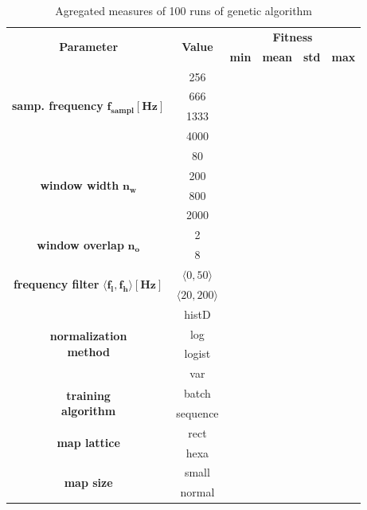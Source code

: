 \documentclass[a4paper,jurnal]{IEEEtran}
\begin{document}
\begin{table}[h]
	\caption{Agregated measures of 100 runs of genetic algorithm}
	\centering
	\begin{tabular}{|c|c||r|r|r|r|}
		\hline
			\multirow{2}{*}{\textbf{Parameter}} & 
			\multirow{2}{*}{\textbf{Value}} & 
			\multicolumn{4}{c|}{\textbf{Fitness}} \\ 
		\cline{3-6}
			& &
			\textbf{min} &
			\textbf{mean} &
			\textbf{std} &
			\textbf{max} \\
		\hline
		\hline
			\multirow{4}{*}{\parbox[c]{20mm}{\centering\textbf{samp. frequency}\\ $ \mathbf{f_{sampl}[Hz]} $}}
			& 256 & & & & \\ \cline{2-6}
			& 666 & & & & \\ \cline{2-6}
			& 1333 & & & & \\ \cline{2-6}
			& 4000 & & & & \\ 
		\hline
			\multirow{4}{*}{\parbox[c]{20mm}{\centering\textbf{window width}\\ $ \mathbf{n_w} $}}
			& 80 & & & & \\ \cline{2-6}
			& 200 & & & & \\ \cline{2-6}
			& 800 & & & & \\ \cline{2-6}
			& 2000 & & & & \\ 
		\hline
			\multirow{2}{*}{\parbox[c]{20mm}{\centering\textbf{window overlap}\\ $ \mathbf{n_o} $}}
			& 2 & & & & \\ \cline{2-6}
			& 8 & & & & \\ 
		\hline		
			\multirow{2}{*}{\parbox[c]{20mm}{\centering\textbf{frequency filter}\\$\mathbf{\langle f_l,f_h \rangle[Hz]}$}}
			& $ \langle 0, 50 \rangle $ & & & & \\ \cline{2-6}
			& $ \langle 20, 200 \rangle $ & & & & \\ 
		\hline
			\multirow{4}{*}{\parbox[c]{20mm}{\centering\textbf{normalization}\\ \textbf{method}}}
			& histD & & & & \\ \cline{2-6}
			& log & & & & \\ \cline{2-6}
			& logist & & & & \\ \cline{2-6}
			& var & & & & \\ 
		\hline
			\multirow{2}{*}{\parbox[c]{20mm}{\centering\textbf{training}\\ \textbf{algorithm}}}
			& batch & & & & \\ \cline{2-6}
			& sequence & & & & \\ 
		\hline
			\multirow{2}{*}{\textbf{map lattice}}
			& rect & & & & \\ \cline{2-6}
			& hexa & & & & \\ 
		\hline
			\multirow{2}{*}{\textbf{map size}}
			& small & & & & \\ \cline{2-6}
			& normal & & & & \\ 
		\hline
	\end{tabular}
	\label{tbl:somagrresults}
\end{table}
\end{document}
